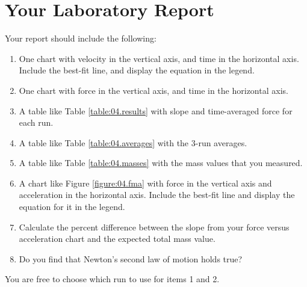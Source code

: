 \section{Your Laboratory Report}
%
Your report should include the following:
\begin{enumerate}
    \item One chart with velocity in the vertical axis, and time in the horizontal axis. Include the best-fit line, and display the equation in the legend.
    \item One chart with force in the vertical axis, and time in the horizontal axis.
    \item A table like Table \ref{table:04.results} with slope and time-averaged force for each run.
    \item A table like Table \ref{table:04.averages} with the 3-run averages.
    \item A table like Table \ref{table:04.masses} with the mass values that you measured.
    \item A chart like Figure \ref{figure:04.fma} with force in the vertical axis and acceleration in the horizontal axis. Include the best-fit line and display the equation for it in the legend.
    \item Calculate the percent difference between the slope from your force versus acceleration chart and the expected total mass value.
    \item Do you find that Newton's second law of motion holds true?
\end{enumerate}
You are free to choose which run to use for items 1 and 2.
%
\newpage

